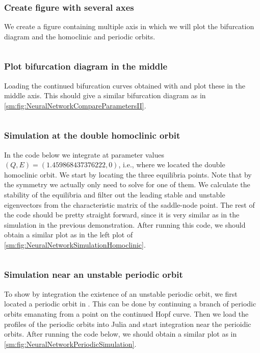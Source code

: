 \subsubsection{Create figure with several axes}
We create a figure containing multiple axis in which we will plot the bifurcation diagram and
the homoclinic and periodic orbits.
\inputminted[firstline=63, lastline=73]{julia}{\pathToJuliaFiles/neural_network_model_simulation_article.jl}

\subsubsection{Plot bifurcation diagram in the middle}
Loading the continued bifurcation curves obtained with \DDEBIFTOOL and plot these in the middle axis.
This should give a similar bifurcation diagram as in \cref{sm:fig:NeuralNetworkCompareParametersII}.
\inputminted[firstline=76, lastline=102]{julia}{\pathToJuliaFiles/neural_network_model_simulation_article.jl}

\subsubsection{Simulation at the double homoclinic orbit}
In the code below we integrate at parameter values $(Q,E)=(1.459868437376222,0)$, i.e.,
where we located the double homoclinic orbit. We start by locating the three equilibria
points. Note that by the symmetry we actually only need to solve for one of them.
We calculate the stability of the equilibria and filter out the leading stable and unstable
eigenvectors from the characteristic matrix of the saddle-node point. 
The rest of the code should be pretty straight forward,
since it is very similar as in the simulation in the previous demonstration.
After running this code, we should obtain a similar plot as in
the left plot of \cref{sm:fig:NeuralNetworkSimulationHomoclinic}.
\inputminted[firstline=105, lastline=166]{julia}{\pathToJuliaFiles/neural_network_model_simulation_article.jl}

\subsubsection{Simulation near an unstable periodic orbit}
To show by integration the existence of an unstable periodic orbit, we first
located a periodic orbit in \DDEBIFTOOL. This can be done by continuing a
branch of periodic orbits emanating from a point on the continued Hopf curve.
Then we load the profiles of the periodic orbits into Julia and start
integration near the perioidic orbits.  After running the code below, we should
obtain a similar plot as in
\cref{sm:fig:NeuralNetworkPeriodicSimulation}.
\inputminted[firstline=169, lastline=208]{julia}{\pathToJuliaFiles/neural_network_model_simulation_article.jl}




